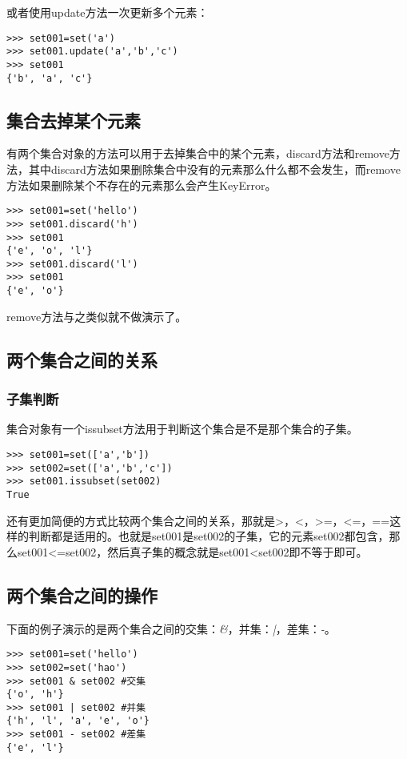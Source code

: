 \documentclass[12pt,oneside]{book}
\begin{document}
\begin{common-format}
或者使用update方法一次更新多个元素：
\begin{Verbatim}
>>> set001=set('a')
>>> set001.update('a','b','c')
>>> set001
{'b', 'a', 'c'}
\end{Verbatim}


\subsection{集合去掉某个元素}
有两个集合对象的方法可以用于去掉集合中的某个元素，discard方法和remove方法，其中discard方法如果删除集合中没有的元素那么什么都不会发生，而remove方法如果删除某个不存在的元素那么会产生KeyError。

\begin{Verbatim}
>>> set001=set('hello')
>>> set001.discard('h')
>>> set001
{'e', 'o', 'l'}
>>> set001.discard('l')
>>> set001
{'e', 'o'}
\end{Verbatim}

remove方法与之类似就不做演示了。

\subsection{两个集合之间的关系}

\subsubsection{子集判断}
集合对象有一个issubset方法用于判断这个集合是不是那个集合的子集。
\begin{Verbatim}
>>> set001=set(['a','b'])
>>> set002=set(['a','b','c'])
>>> set001.issubset(set002)
True
\end{Verbatim}

还有更加简便的方式比较两个集合之间的关系，那就是>，<，>=，<=，==这样的判断都是适用的。也就是set001是set002的子集，它的元素set002都包含，那么set001<=set002，然后真子集的概念就是set001<set002即不等于即可。


\subsection{两个集合之间的操作}
下面的例子演示的是两个集合之间的交集：\emph{\&{}}，并集：\emph{|}，差集：\emph{-}。
\begin{Verbatim}
>>> set001=set('hello')
>>> set002=set('hao')
>>> set001 & set002 #交集
{'o', 'h'}
>>> set001 | set002 #并集
{'h', 'l', 'a', 'e', 'o'}
>>> set001 - set002 #差集
{'e', 'l'}
\end{Verbatim}



\end{common-format}
\end{document}
